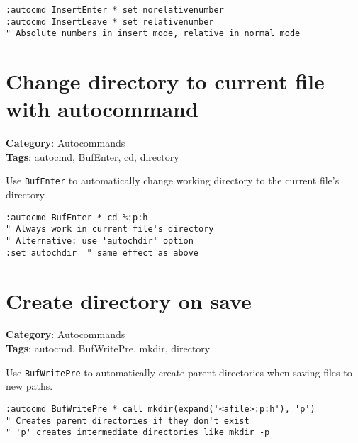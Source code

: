 {\begin{Exa*}{}
\begin{Verbatim}[fontsize=\footnotesize, breaklines, breakanywhere]
:autocmd InsertEnter * set norelativenumber
:autocmd InsertLeave * set relativenumber
" Absolute numbers in insert mode, relative in normal mode
\end{Verbatim}
\end{Exa*}

\section{Change directory to current file with autocommand}

\textbf{Category}: Autocommands\\ \textbf{Tags}: autocmd, BufEnter, cd, directory
\vspace{0.5cm}

Use {\footnotesize \Verb§BufEnter§} to automatically change working directory to the current file's directory.

\begin{Exa*}{}
\begin{Verbatim}[fontsize=\footnotesize, breaklines, breakanywhere]
:autocmd BufEnter * cd %:p:h
" Always work in current file's directory
" Alternative: use 'autochdir' option
:set autochdir  " same effect as above
\end{Verbatim}
\end{Exa*}

\section{Create directory on save}

\textbf{Category}: Autocommands\\ \textbf{Tags}: autocmd, BufWritePre, mkdir, directory
\vspace{0.5cm}

Use {\footnotesize \Verb§BufWritePre§} to automatically create parent directories when saving files to new paths.

\begin{Exa*}{}
\begin{Verbatim}[fontsize=\footnotesize, breaklines, breakanywhere]
:autocmd BufWritePre * call mkdir(expand('<afile>:p:h'), 'p')
" Creates parent directories if they don't exist
" 'p' creates intermediate directories like mkdir -p
\end{Verbatim}
\end{Exa*}

}
